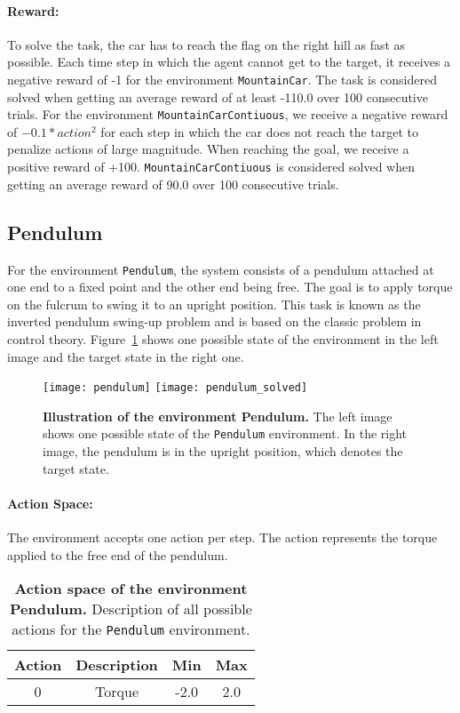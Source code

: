 \paragraph*{Reward:} To solve the task, the car has to reach the flag on the right hill as fast as possible. Each time step in which the agent cannot get to the target, it receives a negative reward of -1 for the environment \verb|MountainCar|. The task is considered solved when getting an average reward of at least -110.0 over 100 consecutive trials. For the environment \verb|MountainCarContiuous|, we receive a negative reward of $-0.1 * action^2$ for each step in which the car does not reach the target to penalize actions of large magnitude. When reaching the goal, we receive a positive reward of +100. \verb|MountainCarContiuous| is considered solved when getting an average reward of 90.0 over 100 consecutive trials.

\subsection{Pendulum}
For the environment \verb|Pendulum|, the system consists of a pendulum attached at one end to a fixed point and the other end being free. The goal is to apply torque on the fulcrum to swing it to an upright position. This task is known as the inverted pendulum swing-up problem and is based on the classic problem in control theory. Figure~\ref{fig:pendulum} shows one possible state of the environment in the left image and the target state in the right one.
 \begin{figure}[!ht]
  \centering
\texttt{[image: pendulum]} \hspace*{10mm}
\texttt{[image: pendulum\_solved]}
\caption[Illustration of the environment Pendulum]{
  \textbf{Illustration of the environment Pendulum.}
  The left image shows one possible state of the \texttt{Pendulum} environment. In the right image, the pendulum is in the upright position, which denotes the target state.
}
\label{fig:pendulum}
\end{figure}

\paragraph*{Action Space:} The environment accepts one action per step. The action represents the torque applied to the free end of the pendulum.
\begin{table}[!ht]
  \centering
  \begin{tabular}{ |c|c|c|c| }
    \hline
    Action & Description & Min & Max \\
    \hline
    0 & Torque & -2.0 & 2.0 \\
    \hline
  \end{tabular}
  \caption[Action space of the environment Pendulum]{
    \textbf{Action space of the environment Pendulum.}
    Description of all possible actions for the \texttt{Pendulum} environment.
  }
  \label{table:pendulum_act}
\end{table}

